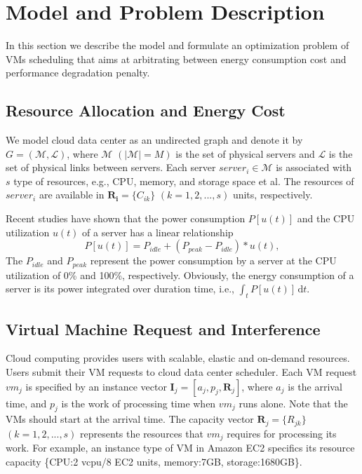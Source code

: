 \documentclass[10pt,journal]{IEEEtran}
\begin{document}
\section{Model and Problem Description}
\label{sec:model}
In this section we describe the model and formulate an optimization problem of VMs scheduling that aims at arbitrating between energy consumption cost and performance degradation penalty.

\subsection{Resource Allocation and Energy Cost}
We model cloud data center as an undirected graph and denote it by $G=(\mathcal{M},\mathcal{L})$, where $\mathcal{M}$ $({\vert}\mathcal{M}{\vert}=M)$ is the set of physical servers and $\mathcal{L}$ is the set of physical links between servers. Each server $server_i{\in}\mathcal{M}$ is associated with $s$ type of resources, e.g., CPU, memory, and storage space et al. The resources of $server_i$ are available in $\bm{R_i}=\{C_{ik}\}$ $(k=1,2,...,s)$ units, respectively.

Recent studies \cite{Kusic09, Fan07} have shown that the power consumption $P[u(t)]$ and the CPU utilization $u(t)$ of a server has a linear relationship
\begin{equation}
P[u(t)]=P_{idle}+(P_{peak}-P_{idle})*u(t),\label{eq:powerCalc}
\end{equation}
The $P_{idle}$ and $P_{peak}$ represent the power consumption by a server at the CPU utilization of 0\% and 100\%, respectively. Obviously, the energy consumption of a server is its power integrated over duration time, i.e., $\int_tP[u(t)]\,\mathrm{d}t$.

\subsection{Virtual Machine Request and Interference}
Cloud computing provides users with scalable, elastic and on-demand resources. Users submit their VM requests to cloud data center scheduler. Each VM request $vm_j$ is specified by an instance vector $\bm{I}_j=[a_j, p_j, \bm{R}_j]$, where $a_j$ is the arrival time, and $p_j$ is the work of processing time when $vm_j$ runs alone. Note that the VMs should start at the arrival time. The capacity vector $\bm{R}_j=\{R_{jk}\}$ $(k=1,2,...,s)$ represents the resources that $vm_j$ requires for processing its work. For example, an instance type of VM in Amazon EC2 \cite{Amazon} specifics its resource capacity \{CPU:2 vcpu/8 EC2 units, memory:7GB, storage:1680GB\}.
\end{document}

